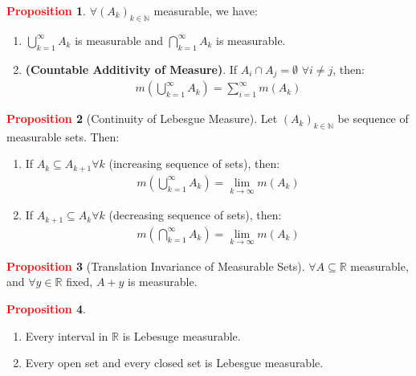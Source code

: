 \documentclass[11pt]{article}
\theoremstyle{definition}
\newcommand{\bb}[1]{\mathbb{#1}}
\theoremstyle{definition}
\newtheorem{prop}{\textcolor{red}{Proposition}}
\theoremstyle{remark}
\begin{document}
\begin{prop}
	$\forall (A_k)_{k \in \bb{N}}$ measurable, we have: 
	\begin{enumerate}[nolistsep]
		\item $\bigcup_{k=1}^\infty A_k$ is measurable and $\bigcap_{k=1}^\infty A_k$ is measurable. 
		\item \textbf{(Countable Additivity of Measure)}. If $A_i \cap A_j = \emptyset$ $\forall i \neq j$, then: 
		\begin{align}
			m \left( 	\bigcup_{k=1}^\infty A_k 	\right) = \sum_{i=1}^\infty m(A_k) 
		\end{align}
	\end{enumerate}	
\end{prop}

\begin{prop}[Continuity of Lebesgue Measure]
	Let $(A_k)_{k \in \bb{N}}$ be sequence of measurable sets. Then: 
	\begin{enumerate}
		\item If $A_k \subseteq A_{k+1} \forall k$ (increasing sequence of sets), then: 
		\begin{align}
			m \left( 	\bigcup_{k=1}^\infty A_k 	\right) = \lim_{k \rightarrow \infty} m(A_k) 
		\end{align}
		\item If $A_{k+1} \subseteq A_k \forall k$ (decreasing sequence of sets), then: 
		\begin{align}
						m \left( 	\bigcap_{k=1}^\infty A_k 	\right) = \lim_{k \rightarrow \infty} m(A_k) 
		\end{align}
	\end{enumerate}
\end{prop}

\begin{prop}[Translation Invariance of Measurable Sets]
	$\forall A \subseteq \bb{R}$ measurable, and $\forall y \in \bb{R}$ fixed, $A+y$ is measurable. 
\end{prop}

\begin{prop}
	\begin{enumerate}[nolistsep]
		\item Every interval in $\bb{R}$ is Lebesuge measurable. 
		\item Every open set and every closed set is Lebesgue measurable. 
	\end{enumerate}
\end{prop}
\end{document}
